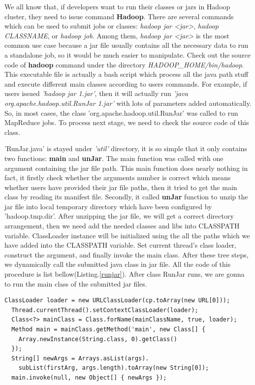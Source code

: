 \documentclass{tufte-book}
\begin{document}
We all know that, if developers want to run their classes or jars in
Hadoop cluster, they need to issue command \textbf{Hadoop}. There are
several commands which can be used to submit jobs or classes:
\textit{hadoop jar <jar>}, \textit{hadoop CLASSNAME}, or
\textit{hadoop job}. Among them, \textit{hadoop jar <jar>} is the most
common use case because a jar file usually contains all the necessary
data to run a standalone job, so it would be much easier to
manipulate. Check out the source code of \textbf{hadoop} command under
the directory \textit{HADOOP\_HOME/bin/hadoop}. This executable file
is actually a bash script which process all the java path stuff and
execute different main classes according to users commands. For
example, if users issued \textit{'hadoop jar 1.jar'}, then it will
actually run \textit{'java org.apache.hadoop.util.RunJar 1.jar'} with
lots of parameters added automatically. So, in most cases, the class
'org.apache.hadoop.util.RunJar' was called to run MapReduce jobs. To
process next stage, we need to check the source code of this class.

'RunJar.java' is stayed under \textit{'util'} directory, it is so simple
that it only contains two functions: \textbf{main} and
\textbf{unJar}. The main function was called with one argument
containing the jar file path. This main function does nearly nothing
in fact, it firstly check whether the arguments number is correct
which means whether users have provided their jar file paths, then it
tried to get the main class by reading its manifest file. Secondly, it
called \textbf{unJar} function to unzip the jar file into local
temporary directory which have been configured by
'hadoop.tmp.dir'. After unzipping the jar file, we will get a correct
directory arrangement, then we need add the needed classes and libs
into CLASSPATH variable. ClassLoader instance will be initialized
using the all the paths which we have added into the CLASSPATH
variable. Set current thread's class loader, construct the argument,
and finally invoke the main class. After these tree steps, we
dynamically call the submitted java class in jar file. All the code of
this procedure is list bellow(Listing.\ref{runjar}). After class RunJar runs, we are gonna
to run the main class of the submitted jar files.

\begin{lstlisting}[caption=RunJar main procedure, label=runjar]
  ClassLoader loader = new URLClassLoader(cp.toArray(new URL[0]));
  Thread.currentThread().setContextClassLoader(loader);
  Class<?> mainClass = Class.forName(mainClassName, true, loader);
  Method main = mainClass.getMethod('main', new Class[] {
    Array.newInstance(String.class, 0).getClass()
  });
  String[] newArgs = Arrays.asList(args).
    subList(firstArg, args.length).toArray(new String[0]);
  main.invoke(null, new Object[] { newArgs });
\end{lstlisting}
\end{document}
